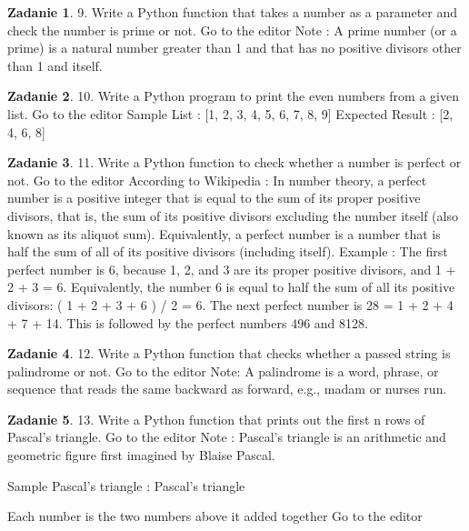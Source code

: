 \documentclass[11pt]{article}
\theoremstyle{definition}
\newtheorem{zadanie}{Zadanie}
\begin{document}
\begin{zadanie}


9. Write a Python function that takes a number as a parameter and check the number is prime or not. Go to the editor
Note : A prime number (or a prime) is a natural number greater than 1 and that has no positive divisors other than 1 and itself.


\end{zadanie}

\begin{zadanie}


10. Write a Python program to print the even numbers from a given list. Go to the editor
Sample List : [1, 2, 3, 4, 5, 6, 7, 8, 9]
Expected Result : [2, 4, 6, 8]


\end{zadanie}

\begin{zadanie}


11. Write a Python function to check whether a number is perfect or not. Go to the editor
According to Wikipedia : In number theory, a perfect number is a positive integer that is equal to the sum of its proper positive divisors, that is, the sum of its positive divisors excluding the number itself (also known as its aliquot sum). Equivalently, a perfect number is a number that is half the sum of all of its positive divisors (including itself).
Example : The first perfect number is 6, because 1, 2, and 3 are its proper positive divisors, and 1 + 2 + 3 = 6. Equivalently, the number 6 is equal to half the sum of all its positive divisors: ( 1 + 2 + 3 + 6 ) / 2 = 6. The next perfect number is 28 = 1 + 2 + 4 + 7 + 14. This is followed by the perfect numbers 496 and 8128.


\end{zadanie}

\begin{zadanie}


12. Write a Python function that checks whether a passed string is palindrome or not. Go to the editor
Note: A palindrome is a word, phrase, or sequence that reads the same backward as forward, e.g., madam or nurses run.


\end{zadanie}

\begin{zadanie}


13. Write a Python function that prints out the first n rows of Pascal's triangle. Go to the editor
Note : Pascal's triangle is an arithmetic and geometric figure first imagined by Blaise Pascal.

Sample Pascal's triangle :
Pascal's triangle

Each number is the two numbers above it added together Go to the editor


\end{zadanie}
\end{document}
